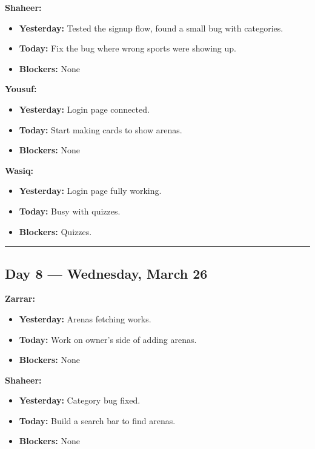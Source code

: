 \documentclass[12pt,a4paper]{article}
\begin{document}
\textbf{Shaheer:}
\begin{itemize}[noitemsep]
    \item \textbf{Yesterday:} Tested the signup flow, found a small bug with categories.
    \item \textbf{Today:} Fix the bug where wrong sports were showing up.
    \item \textbf{Blockers:} None
\end{itemize}

\textbf{Yousuf:}
\begin{itemize}[noitemsep]
    \item \textbf{Yesterday:} Login page connected.
    \item \textbf{Today:} Start making cards to show arenas.
    \item \textbf{Blockers:} None
\end{itemize}

\textbf{Wasiq:}
\begin{itemize}[noitemsep]
    \item \textbf{Yesterday:} Login page fully working.
    \item \textbf{Today:} Busy with quizzes.
    \item \textbf{Blockers:} Quizzes.
\end{itemize}

\vspace{1em}
\hrule
\vspace{1em}

\subsection*{Day 8 --- Wednesday, March 26}

\textbf{Zarrar:}
\begin{itemize}[noitemsep]
    \item \textbf{Yesterday:} Arenas fetching works.
    \item \textbf{Today:} Work on owner's side of adding arenas.
    \item \textbf{Blockers:} None
\end{itemize}

\textbf{Shaheer:}
\begin{itemize}[noitemsep]
    \item \textbf{Yesterday:} Category bug fixed.
    \item \textbf{Today:} Build a search bar to find arenas.
    \item \textbf{Blockers:} None
\end{itemize}
\end{document}
